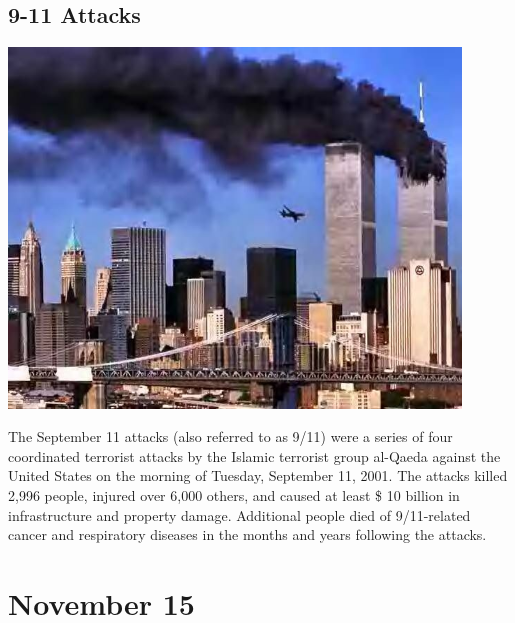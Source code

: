 \documentclass[11pt]{report}
\begin{document}
\subsection{9-11 Attacks}
\vspace{2mm}\begin{center}\includegraphics[width=12cm]{./img/9-11.jpg}\end{center}
The September 11 attacks (also referred to as 9/11) were a series of four coordinated terrorist attacks by the Islamic terrorist group al-Qaeda against the United States on the morning of Tuesday, September 11, 2001. The attacks killed 2,996 people, injured over 6,000 others, and caused at least \$ 10 billion in infrastructure and property damage. Additional people died of 9/11-related cancer and respiratory diseases in the months and years following the attacks.

\section{November 15}
\end{document}
